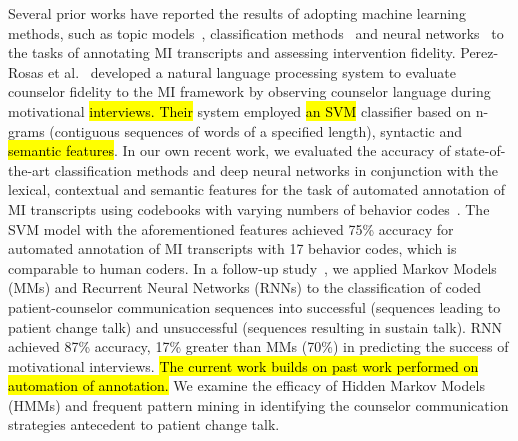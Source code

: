 \documentclass[smallextended]{svjour3}       %
\begin{document}
Several prior works have reported the results of adopting machine learning methods, such as topic models~\cite{kotov2014towards, gaut2017content, imel2015computational, kotov2015interpretable, atkins2014scaling}, classification methods~\cite{hasan2016study, can2016sounds, perez2017predicting, perez2017understanding} and neural networks~\cite{hasan2016study, tanana2015recursive, tanana2016comparison} to the tasks of annotating MI transcripts and assessing intervention fidelity. Perez-Rosas et al.~\cite{perez2017predicting} developed a natural language processing system to evaluate counselor fidelity to the MI framework by observing counselor language during motivational \hl{interviews. Their} system employed \hl{an SVM} classifier based on n-grams (contiguous sequences of words of a specified length), syntactic and \hl{semantic features}. In our own recent work, we evaluated the accuracy of state-of-the-art classification methods and deep neural networks in conjunction with the lexical, contextual and semantic features for the task of automated annotation of MI transcripts using codebooks with varying numbers of behavior codes~\cite{hasan2016study}. The SVM model with the aforementioned features achieved 75\% accuracy for automated annotation of MI transcripts with 17 behavior codes, which is comparable to human coders. In a follow-up study~\cite{hasan2018predicting}, we applied Markov Models (MMs) and Recurrent Neural Networks (RNNs) to the classification of coded patient-counselor communication sequences into successful (sequences leading to patient change talk) and unsuccessful (sequences resulting in sustain talk). RNN achieved 87\% accuracy, 17\% greater than MMs (70\%) in predicting the success of motivational interviews. \hl{The current work builds on past work performed on automation of annotation.} We examine the efficacy of Hidden Markov Models (HMMs) and frequent pattern mining in identifying the counselor communication strategies antecedent to patient change talk.
\end{document}
